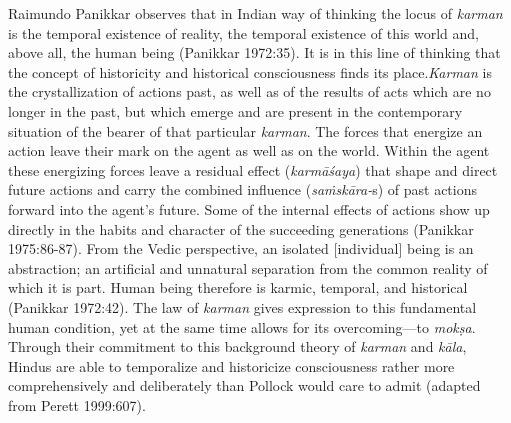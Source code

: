 Raimundo Panikkar observes that in Indian way of thinking the locus of \textit{karman} is the temporal existence of reality, the temporal existence of this world and, above all, the human being (Panikkar 1972:35). It is in this line of thinking that the concept of historicity and historical consciousness finds its place.\textit{Karman} is the crystallization of actions past, as well as of the results of acts which are no longer in the past, but which emerge and are present in the contemporary situation of the bearer of that particular \textit{karman}. The forces that energize an action leave their mark on the agent as well as on the world. Within the agent these energizing forces leave a residual effect (\textit{karmāśaya}) that shape and direct future actions and carry the combined influence (\textit{saṁskāra-}s) of past actions forward into the agent's future. Some of the internal effects of actions show up directly in the habits and character of the succeeding generations (Panikkar 1975:86-87). From the Vedic perspective, an isolated [individual] being is an abstraction; an artificial and unnatural separation from the common reality of which it is part. Human being therefore is karmic, temporal, and historical (Panikkar 1972:42). The law of \textit{karman} gives expression to this fundamental human condition, yet at the same time allows for its overcoming—to \textit{mokṣa}. Through their commitment to this background theory of \textit{karman} and \textit{kāla}, Hindus are able to temporalize and historicize consciousness rather more comprehensively and deliberately than Pollock would care to admit (adapted from Perett 1999:607).

